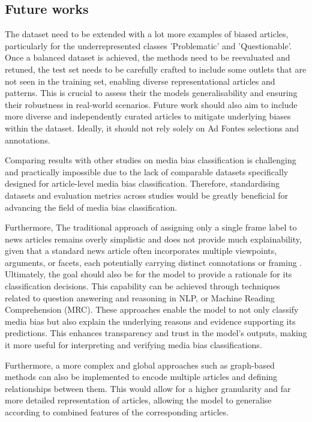\subsection{Future works}

The dataset need to be extended with a lot more examples of biased articles, particularly for the underrepresented classes 'Problematic' and 'Questionable'. Once a balanced dataset is achieved, the methods need to be reevaluated and retuned, the test set needs to be carefully crafted to include some outlets that are not seen in the training set, enabling diverse representational articles and patterns. This is crucial to assess their the models generalisability and ensuring their robustness in real-world scenarios. Future work should also aim to include more diverse and independently curated articles to mitigate underlying biases within the dataset. Ideally, it should not rely solely on Ad Fontes selections and annotations.

Comparing results with other studies on media bias classification is challenging and practically impossible due to the lack of comparable datasets specifically designed for article-level media bias classification. Therefore, standardising datasets and evaluation metrics across studies would be greatly beneficial for advancing the field of media bias classification.

Furthermore, The traditional approach of assigning only a single frame label to news articles remains overly simplistic and does not provide much explainability, given that a standard news article often incorporates multiple viewpoints, arguments, or facets, each potentially carrying distinct connotations or framing \cite{vallejo-2023-connecting}. Ultimately, the goal should also be for the model to provide a rationale for its classification decisions. This capability can be achieved through techniques related to question answering and reasoning in NLP, or Machine Reading Comprehension (MRC). These approaches enable the model to not only classify media bias but also explain the underlying reasons and evidence supporting its predictions. This enhances transparency and trust in the model's outputs, making it more useful for interpreting and verifying media bias classifications.


Furthermore, a more complex and global approaches such as graph-based methods can also be implemented to encode multiple articles and defining relationships between them. This would allow for a higher granularity and far more detailed representation of articles, allowing the model to generalise according to combined features of the corresponding articles.




